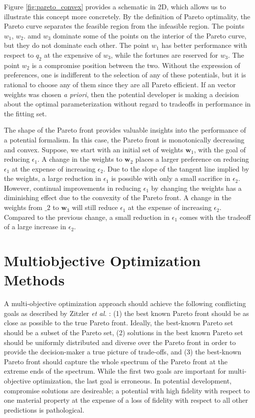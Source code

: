 Figure \ref{fig:pareto_convex} provides a schematic in 2D, which allows us to illustrate this concept more concretely.  By the definition of Pareto optimality, the Pareto curve separates the feasible region from the infeasible region.  The points $w_1$, $w_2$. amd $w_3$ dominate some of the points on the interior of the Pareto curve, but they do not dominate each other.  The point $w_1$ has better performance with respect to $q_2$ at the expensive of $w_3$, while the fortunes are reserved for $w_3$.  The point $w_2$ is a compromise position between the two.  Without the expression of preferences, one is indifferent to the selection of any of these potentials, but it is rational to choose any of them since they are all Pareto efficient.  If an vector weights was chosen \emph{a priori}, then the potential developer is making a decision about the optimal parameterization without regard to tradeoffs in performance in the fitting set.

The shape of the Pareto front provides valuable insights into the performance of a potential formalism.  In this case, the Pareto front is monotonically decreasing and convex.    Suppose, we start with an initial set of weights $\bm{w}_1$, with the goal of reducing $\epsilon_1$.  A change in the weights to $\bm{w}_2$ places a larger preference on reducing $\epsilon_1$ at the expense of increasing $\epsilon_2$.  Due to the slope of the tangent line implied by the weights, a large reduction in $\epsilon_1$ is possible with only a small sacrifice in $\epsilon_2$.  However, continual improvements in reducing $\epsilon_1$ by changing the weights has a diminishing effect due to the convexity of the Pareto front.  A change in the weights from $\bm_{2}$ to $\bm{w}_3$ will still reduce $\epsilon_1$ at the expense of increasing $\epsilon_2$.  Compared to the previous change, a small reduction in $\epsilon_1$ comes with the tradeoff of a large increase in $\epsilon_2$.

\section{Multiobjective Optimization Methods}
A multi-objective optimization approach should achieve the following conflicting goals as described by Zitzler \emph{et al.} \cite{zitzler2000_moo_evolve}: (1) the best known Pareto front should be as close as possible to the true Pareto front.  Ideally, the best-known Pareto set should be a subset of the Pareto set, (2) solutions in the best known Pareto set should be uniformly distributed and diverse over the Pareto front in order to provide the decision-maker a true picture of trade-offs, and (3) the best-known Pareto front should capture the whole spectrum of the Pareto front at the extreme ends of the spectrum.  While the first two goals are important for multi-objective optimization, the last goal is erroneous.  In potential development, compromise solutions are desireable; a potential with high fidelity with respect to one material property at the expense of a loss of fidelity with respect to all other predictions is pathological.

